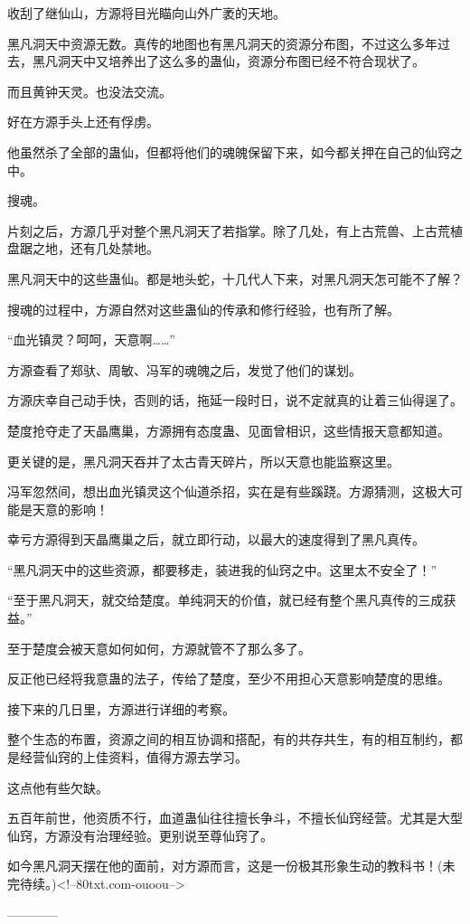 \begin{this_body}
收刮了继仙山，方源将目光瞄向山外广袤的天地。

黑凡洞天中资源无数。真传的地图也有黑凡洞天的资源分布图，不过这么多年过去，黑凡洞天中又培养出了这么多的蛊仙，资源分布图已经不符合现状了。

而且黄钟天灵。也没法交流。

好在方源手头上还有俘虏。

他虽然杀了全部的蛊仙，但都将他们的魂魄保留下来，如今都关押在自己的仙窍之中。

搜魂。

片刻之后，方源几乎对整个黑凡洞天了若指掌。除了几处，有上古荒兽、上古荒植盘踞之地，还有几处禁地。

黑凡洞天中的这些蛊仙。都是地头蛇，十几代人下来，对黑凡洞天怎可能不了解？

搜魂的过程中，方源自然对这些蛊仙的传承和修行经验，也有所了解。

“血光镇灵？呵呵，天意啊……”

方源查看了郑驮、周敏、冯军的魂魄之后，发觉了他们的谋划。

方源庆幸自己动手快，否则的话，拖延一段时日，说不定就真的让着三仙得逞了。

楚度抢夺走了天晶鹰巢，方源拥有态度蛊、见面曾相识，这些情报天意都知道。

更关键的是，黑凡洞天吞并了太古青天碎片，所以天意也能监察这里。

冯军忽然间，想出血光镇灵这个仙道杀招，实在是有些蹊跷。方源猜测，这极大可能是天意的影响！

幸亏方源得到天晶鹰巢之后，就立即行动，以最大的速度得到了黑凡真传。

“黑凡洞天中的这些资源，都要移走，装进我的仙窍之中。这里太不安全了！”

“至于黑凡洞天，就交给楚度。单纯洞天的价值，就已经有整个黑凡真传的三成获益。”

至于楚度会被天意如何如何，方源就管不了那么多了。

反正他已经将我意蛊的法子，传给了楚度，至少不用担心天意影响楚度的思维。

接下来的几日里，方源进行详细的考察。

整个生态的布置，资源之间的相互协调和搭配，有的共存共生，有的相互制约，都是经营仙窍的上佳资料，值得方源去学习。

这点他有些欠缺。

五百年前世，他资质不行，血道蛊仙往往擅长争斗，不擅长仙窍经营。尤其是大型仙窍，方源没有治理经验。更别说至尊仙窍了。

如今黑凡洞天摆在他的面前，对方源而言，这是一份极其形象生动的教科书！(未完待续。)<!--80txt.com-ouoou-->

------------

\end{this_body}

